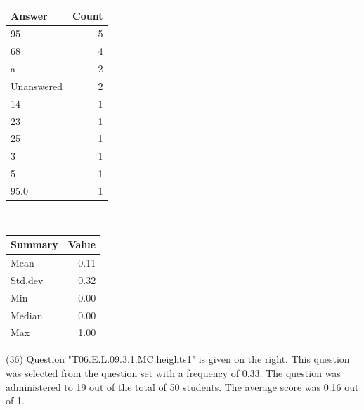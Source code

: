 \documentclass[12pt,english,nohyper]{tufte-handout}\usepackage[]{graphicx}\usepackage[]{color}
\begin{document}
\begin{center}%
\begin{tabular}{lr}
  \hline
Answer & Count \\ 
  \hline
95 &   5 \\ 
  68 &   4 \\ 
  a &   2 \\ 
  Unanswered &   2 \\ 
  14 &   1 \\ 
  23 &   1 \\ 
  25 &   1 \\ 
  3 &   1 \\ 
  5 &   1 \\ 
  95.0 &   1 \\ 
   \hline
\end{tabular}
~~~~~~~~%
\begin{tabular}{lr}
  \hline
Summary & Value \\ 
  \hline
Mean & 0.11 \\ 
  Std.dev & 0.32 \\ 
  Min & 0.00 \\ 
  Median & 0.00 \\ 
  Max & 1.00 \\ 
   \hline
\end{tabular}
\end{center}\newpage{} (36) Question "T06.E.L.09.3.1.MC.heights1" is given on the right. This question was selected from the question set with a frequency of 0.33. The question was administered to 19 out of the total of 50 students. The average score was 0.16 out of 1.
\end{document}
